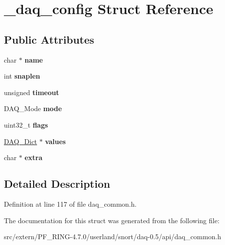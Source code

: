 \hypertarget{struct__daq__config}{
\section{\_\-daq\_\-config Struct Reference}
\label{struct__daq__config}
}
\subsection*{Public Attributes}
\begin{DoxyCompactItemize}
\item 
\hypertarget{struct__daq__config_a86a815eb3c254dd7003a0f7b7e9dba02}{
char $\ast$ {\bfseries name}}
\label{struct__daq__config_a86a815eb3c254dd7003a0f7b7e9dba02}

\item 
\hypertarget{struct__daq__config_aeb345b0b837a27779f3578ec391d5281}{
int {\bfseries snaplen}}
\label{struct__daq__config_aeb345b0b837a27779f3578ec391d5281}

\item 
\hypertarget{struct__daq__config_ad9e15f8ead02d6a007dea29c1d444472}{
unsigned {\bfseries timeout}}
\label{struct__daq__config_ad9e15f8ead02d6a007dea29c1d444472}

\item 
\hypertarget{struct__daq__config_a15f6fdccd1e22eed47e9f1fc9553a3b9}{
DAQ\_\-Mode {\bfseries mode}}
\label{struct__daq__config_a15f6fdccd1e22eed47e9f1fc9553a3b9}

\item 
\hypertarget{struct__daq__config_add04bd8b8f1c94e5f08953bb6233e0f3}{
uint32\_\-t {\bfseries flags}}
\label{struct__daq__config_add04bd8b8f1c94e5f08953bb6233e0f3}

\item 
\hypertarget{struct__daq__config_ac44193c1646faf1b83e4d44290454b0e}{
\hyperlink{struct__daq__dict__entry}{DAQ\_\-Dict} $\ast$ {\bfseries values}}
\label{struct__daq__config_ac44193c1646faf1b83e4d44290454b0e}

\item 
\hypertarget{struct__daq__config_a27ad4580c46e1e2fc304f45f8eba2878}{
char $\ast$ {\bfseries extra}}
\label{struct__daq__config_a27ad4580c46e1e2fc304f45f8eba2878}

\end{DoxyCompactItemize}


\subsection{Detailed Description}


Definition at line 117 of file daq\_\-common.h.



The documentation for this struct was generated from the following file:\begin{DoxyCompactItemize}
\item 
src/extern/PF\_\-RING-\/4.7.0/userland/snort/daq-\/0.5/api/daq\_\-common.h\end{DoxyCompactItemize}
